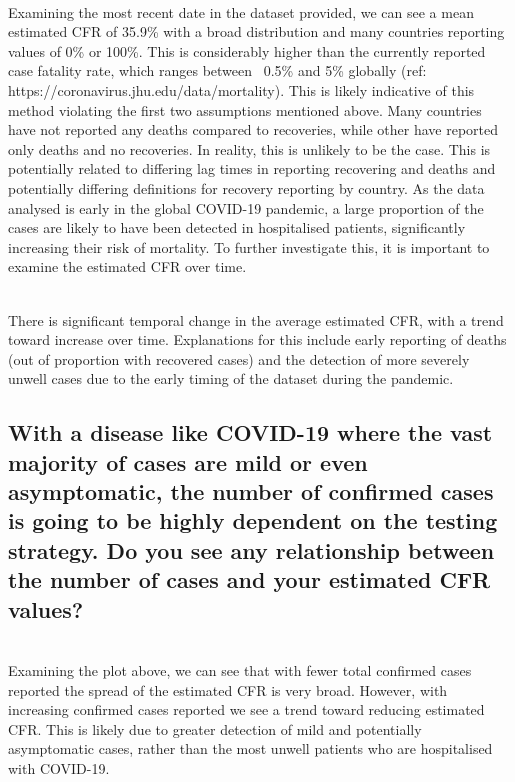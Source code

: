 \documentclass[8pt]{article}
\begin{document}
    \begin{center}
    \end{center}
    { \hspace*{\fill} \\}
    Examining the most recent date in the dataset provided, we can see a mean estimated CFR of 35.9\% with a broad distribution and many countries reporting values of 0\% or 100\%. This is considerably higher than the currently reported case fatality rate, which ranges between ~0.5\% and 5\% globally (ref: https://coronavirus.jhu.edu/data/mortality). This is likely indicative of this method violating the first two assumptions mentioned above. Many countries have not reported any deaths compared to recoveries, while other have reported only deaths and no recoveries. In reality, this is unlikely to be the case.  This is potentially related to differing lag times in reporting recovering and deaths and potentially differing definitions for recovery reporting by country. As the data analysed is early in the global COVID-19 pandemic, a large proportion of the cases are likely to have been detected in hospitalised patients, significantly increasing their risk of mortality. To further investigate this, it is important to examine the estimated CFR over time.


    \begin{center}
    \end{center}
    { \hspace*{\fill} \\}
    There is significant temporal change in the average estimated CFR, with a trend toward increase over time. Explanations for this include early reporting of deaths (out of proportion with recovered cases) and the detection of more severely unwell cases due to the early timing of the dataset during the pandemic.\subsection{With a disease like COVID-19 where the vast majority of cases are mild or even asymptomatic, the number of confirmed cases is going to be highly dependent on the testing strategy. Do you see any relationship between the number of cases and your estimated CFR values?}


    \begin{center}
    \end{center}
    { \hspace*{\fill} \\}
    Examining the plot above, we can see that with fewer total confirmed cases reported the spread of the estimated CFR is very broad. However, with increasing confirmed cases reported we see a trend toward reducing estimated CFR. This is likely due to greater detection of mild and potentially asymptomatic cases, rather than the most unwell patients who are hospitalised with COVID-19.
\end{document}
